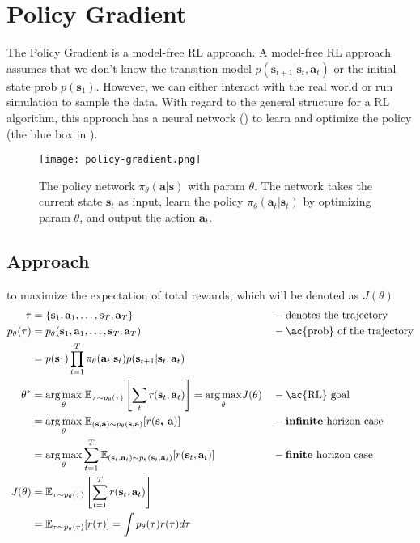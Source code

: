 \chapter{Policy Gradient}

The Policy Gradient is a model-free \ac{RL} approach. A model-free \ac{RL} approach assumes that we don't know the transition model $p(\textbf{s}_{t+1} | \textbf{s}_t, \textbf{a}_t)$ or the initial state \ac{prob} $p(\textbf{s}_1)$. However, we can either interact with the real world or run simulation to sample the data. With regard to the general structure for a \ac{RL} algorithm, this approach has a neural network () to learn and optimize the policy (the blue box in ).

\begin{figure}[hbt!]
	\centering
	\texttt{[image: policy-gradient.png]}
	\caption{The policy network $\pi_{\theta}(\textbf{a}|\textbf{s})$ with \ac{param} $\theta$. The network takes the current state $\textbf{s}_t$ as input, learn the policy $\pi_{\theta}(\textbf{a}_t|\textbf{s}_t)$ by optimizing \ac{param} $\theta$, and output the action $\textbf{a}_t$.}
	\label{fig:policy-gradient}
\end{figure}

\section{Approach}
 to maximize the expectation of total rewards, which will be denoted as $J(\theta)$
\begin{align}
	\tau & = \{ \textbf{s}_1, \textbf{a}_1, \dots, \textbf{s}_T, \textbf{a}_T \} &&-\text{denotes the trajectory}\\
	p_\theta(\tau) & = p_\theta(\textbf{s}_1, \textbf{a}_1, \dots, \textbf{s}_T, \textbf{a}_T) &&-\text{\ac{prob} of the trajectory}\\
	& = p(\textbf{s}_1) \prod_{t=1}^T \pi_{\theta}(\textbf{a}_t | \textbf{s}_t) p(\textbf{s}_{t+1} | \textbf{s}_t, \textbf{a}_t) \label{eq:traj-prob}\\
	\theta^* & = \underset{\theta}{\arg\max} \;\mathbb{E}_{\tau\sim p_\theta(\tau)} \left[ \sum_t r(\textbf{s}_t, \textbf{a}_t) \right] = \underset{\theta}{\arg\max} J(\theta) &&-\text{\ac{RL} goal}\\
	& = \underset{\theta}{\arg\max}\;\mathbb{E}_{(\textbf{s,a})\sim p_\theta(\textbf{s,a})} [r(\textbf{s, a})] &&-\text{\textbf{infinite} horizon case}\\
	& = \underset{\theta}{\arg\max} \sum_{t=1}^{T} \mathbb{E}_{(\textbf{s}_t,\textbf{a}_t)\sim p_\theta(\textbf{s}_t,\textbf{a}_t)} [r(\textbf{s}_t,\textbf{a}_t)] &&-\text{\textbf{finite} horizon case}\\
	J(\theta) & = \mathbb{E}_{\tau\sim p_\theta(\tau)} \left[ \sum_{t=1}^T r(\textbf{s}_t, \textbf{a}_t) \right]\\
	& = \mathbb{E}_{\tau\sim p_\theta(\tau)} [r(\tau)] = \int p_\theta(\tau) r(\tau) d\tau
\end{align}

